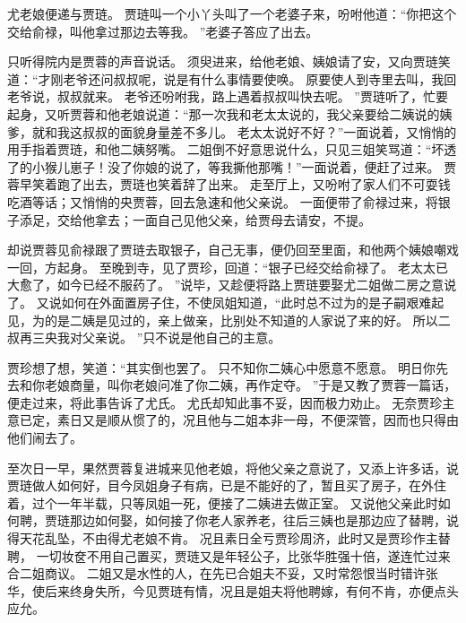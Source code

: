 尤老娘便递与贾琏。
贾琏叫一个小丫头叫了一个老婆子来，吩咐他道：“你把这个交给俞禄，叫他拿过那边去等我。
”老婆子答应了出去。
\par
只听得院内是贾蓉的声音说话。
须臾进来，给他老娘、姨娘请了安，又向贾琏笑道：“才刚老爷还问叔叔呢，说是有什么事情要使唤。
原要使人到寺里去叫，我回老爷说，叔叔就来。
老爷还吩咐我，路上遇着叔叔叫快去呢。
”贾琏听了，忙要起身，又听贾蓉和他老娘说道：“那一次我和老太太说的，我父亲要给二姨说的姨爹，就和我这叔叔的面貌身量差不多儿。
老太太说好不好？”一面说着，又悄悄的用手指着贾琏，和他二姨努嘴。
二姐倒不好意思说什么，只见三姐笑骂道：“坏透了的小猴儿崽子！没了你娘的说了，等我撕他那嘴！”一面说着，便赶了过来。
贾蓉早笑着跑了出去，贾琏也笑着辞了出来。
走至厅上，又吩咐了家人们不可耍钱吃酒等话；又悄悄的央贾蓉，回去急速和他父亲说。
一面便带了俞禄过来，将银子添足，交给他拿去；一面自己见他父亲，给贾母去请安，不提。
\par
却说贾蓉见俞禄跟了贾琏去取银子，自己无事，便仍回至里面，和他两个姨娘嘲戏一回，方起身。
至晚到寺，见了贾珍，回道：“银子已经交给俞禄了。
老太太已大愈了，如今已经不服药了。
”说毕，又趁便将路上贾琏要娶尤二姐做二房之意说了。
又说如何在外面置房子住，不使凤姐知道，“此时总不过为的是子嗣艰难起见，为的是二姨是见过的，亲上做亲，比别处不知道的人家说了来的好。
所以二叔再三央我对父亲说。
”只不说是他自己的主意。
\par
贾珍想了想，笑道：“其实倒也罢了。
只不知你二姨心中愿意不愿意。
明日你先去和你老娘商量，叫你老娘问准了你二姨，再作定夺。
”于是又教了贾蓉一篇话，便走过来，将此事告诉了尤氏。
尤氏却知此事不妥，因而极力劝止。
无奈贾珍主意已定，素日又是顺从惯了的，况且他与二姐本非一母，不便深管，因而也只得由他们闹去了。
\par
至次日一早，果然贾蓉复进城来见他老娘，将他父亲之意说了，又添上许多话，说贾琏做人如何好，目今凤姐身子有病，已是不能好的了，暂且买了房子，在外住着，过个一年半载，只等凤姐一死，便接了二姨进去做正室。
又说他父亲此时如何聘，贾琏那边如何娶，如何接了你老人家养老，往后三姨也是那边应了替聘，说得天花乱坠，不由得尤老娘不肯。
况且素日全亏贾珍周济，此时又是贾珍作主替聘，
一切妆奁不用自己置买，贾琏又是年轻公子，比张华胜强十倍，遂连忙过来合二姐商议。
二姐又是水性的人，在先已合姐夫不妥，又时常怨恨当时错许张华，使后来终身失所，今见贾琏有情，况且是姐夫将他聘嫁，有何不肯，亦便点头应允。
